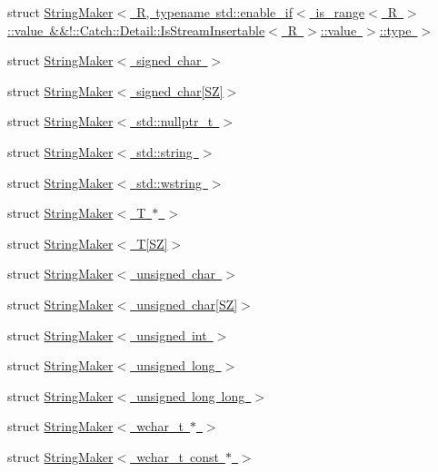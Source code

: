 \begin{DoxyCompactItemize}
struct \mbox{\hyperlink{struct_catch_1_1_string_maker_3_01_r_00_01typename_01std_1_1enable__if_3_01is__range_3_01_r_01_4536d8fedfff6d62432b3dc59b56e1380}{String\+Maker$<$ R, typename std\+::enable\+\_\+if$<$ is\+\_\+range$<$ R $>$\+::value \&\&!\+::\+Catch\+::\+Detail\+::\+Is\+Stream\+Insertable$<$ R $>$\+::value $>$\+::type $>$}}
\item 
struct \mbox{\hyperlink{struct_catch_1_1_string_maker_3_01signed_01char_01_4}{String\+Maker$<$ signed char $>$}}
\item 
struct \mbox{\hyperlink{struct_catch_1_1_string_maker_3_01signed_01char[_s_z]_4}{String\+Maker$<$ signed char\mbox{[}\+S\+Z\mbox{]}$>$}}
\item 
struct \mbox{\hyperlink{struct_catch_1_1_string_maker_3_01std_1_1nullptr__t_01_4}{String\+Maker$<$ std\+::nullptr\+\_\+t $>$}}
\item 
struct \mbox{\hyperlink{struct_catch_1_1_string_maker_3_01std_1_1string_01_4}{String\+Maker$<$ std\+::string $>$}}
\item 
struct \mbox{\hyperlink{struct_catch_1_1_string_maker_3_01std_1_1wstring_01_4}{String\+Maker$<$ std\+::wstring $>$}}
\item 
struct \mbox{\hyperlink{struct_catch_1_1_string_maker_3_01_t_01_5_01_4}{String\+Maker$<$ T $\ast$ $>$}}
\item 
struct \mbox{\hyperlink{struct_catch_1_1_string_maker_3_01_t[_s_z]_4}{String\+Maker$<$ T\mbox{[}\+S\+Z\mbox{]}$>$}}
\item 
struct \mbox{\hyperlink{struct_catch_1_1_string_maker_3_01unsigned_01char_01_4}{String\+Maker$<$ unsigned char $>$}}
\item 
struct \mbox{\hyperlink{struct_catch_1_1_string_maker_3_01unsigned_01char[_s_z]_4}{String\+Maker$<$ unsigned char\mbox{[}\+S\+Z\mbox{]}$>$}}
\item 
struct \mbox{\hyperlink{struct_catch_1_1_string_maker_3_01unsigned_01int_01_4}{String\+Maker$<$ unsigned int $>$}}
\item 
struct \mbox{\hyperlink{struct_catch_1_1_string_maker_3_01unsigned_01long_01_4}{String\+Maker$<$ unsigned long $>$}}
\item 
struct \mbox{\hyperlink{struct_catch_1_1_string_maker_3_01unsigned_01long_01long_01_4}{String\+Maker$<$ unsigned long long $>$}}
\item 
struct \mbox{\hyperlink{struct_catch_1_1_string_maker_3_01wchar__t_01_5_01_4}{String\+Maker$<$ wchar\+\_\+t $\ast$ $>$}}
\item 
struct \mbox{\hyperlink{struct_catch_1_1_string_maker_3_01wchar__t_01const_01_5_01_4}{String\+Maker$<$ wchar\+\_\+t const $\ast$ $>$}}

\end{DoxyCompactItemize}
